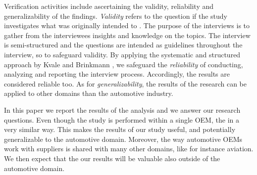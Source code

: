  Verification activities include ascertaining the validity, reliability and generalizability of the findings. {\em Validity} refers to the question if the study investigates what was originally intended to \cite{Kvale2015Interviews}. The purpose of the interviews is to gather from the interviewees insights and knowledge on the topics. The interview is semi-structured and the questions are intended as guidelines throughout the interview, so to safeguard validity. %
By applying the systematic and structured approach by Kvale and Brinkmann \cite{Kvale2015Interviews}, we safeguard the {\em reliability} of conducting, analyzing and reporting the interview process. Accordingly, the results are considered reliable too. As for {\em generalizability}, the results of the research can be applied to other domains than the automotive industry. %

 In this paper we report the results of the analysis and we answer our research questions. 
Even though the study is performed within a single OEM, the  %
{in a very similar way}. 
This %
{makes} the results of our study %
{useful, and potentially generalizable} to the automotive domain. 
Moreover, the way automotive OEMs work with suppliers is shared with many other domains, like for instance aviation. We then expect that the our results will be valuable also outside of the automotive domain. 


